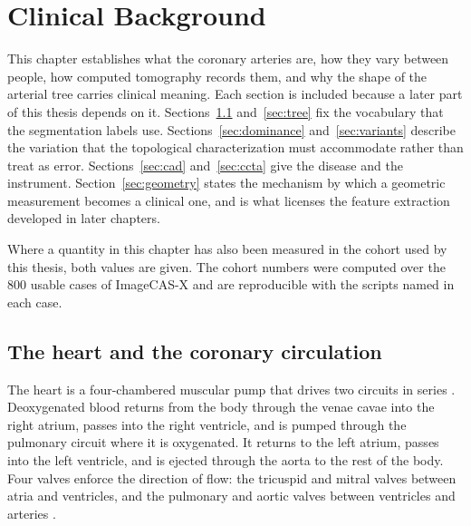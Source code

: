 %

\chapter{Clinical Background}
\label{ch:clinical}

This chapter establishes what the coronary arteries are, how they vary between people, how
computed tomography records them, and why the shape of the arterial tree carries clinical
meaning.
Each section is included because a later part of this thesis depends on it.
Sections~\ref{sec:heart} and~\ref{sec:tree} fix the vocabulary that the segmentation labels
use.
Sections~\ref{sec:dominance} and~\ref{sec:variants} describe the variation that the
topological characterization must accommodate rather than treat as error.
Sections~\ref{sec:cad} and~\ref{sec:ccta} give the disease and the instrument.
Section~\ref{sec:geometry} states the mechanism by which a geometric measurement becomes a
clinical one, and is what licenses the feature extraction developed in later chapters.

Where a quantity in this chapter has also been measured in the cohort used by this thesis,
both values are given.
The cohort numbers were computed over the 800 usable cases of ImageCAS-X
\cite{bransby2026imagecasx} and are reproducible with the scripts named in each case.

\section{The heart and the coronary circulation}
\label{sec:heart}

The heart is a four-chambered muscular pump that drives two circuits in series
\cite{weinhaus2024anatomy}.
Deoxygenated blood returns from the body through the venae cavae into the right atrium,
passes into the right ventricle, and is pumped through the pulmonary circuit where it is
oxygenated.
It returns to the left atrium, passes into the left ventricle, and is ejected through the
aorta to the rest of the body.
Four valves enforce the direction of flow: the tricuspid and mitral valves between atria and
ventricles, and the pulmonary and aortic valves between ventricles and arteries
\cite{weinhaus2024anatomy,shah2009heart}.

